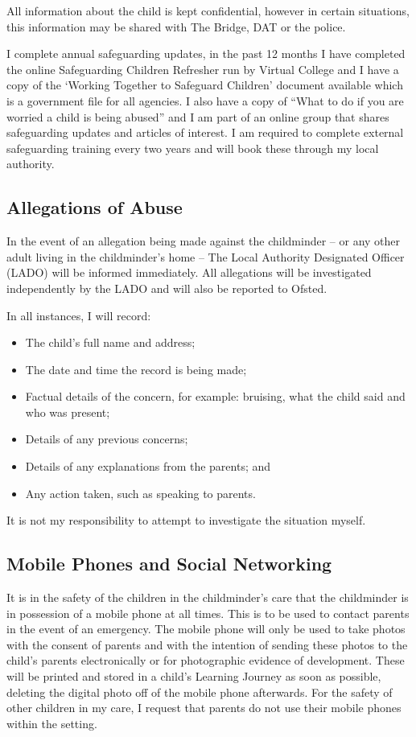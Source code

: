 All information about the child is kept confidential, however in certain
situations, this information may be shared with The Bridge, DAT or the
police.

I complete annual safeguarding updates, in the past 12 months I have completed the 
online Safeguarding Children Refresher run by Virtual College and I have a copy of 
the ‘Working Together to Safeguard Children’ document available which is 
a government file for all agencies. I also have a copy of “What to do if you are 
worried a child is being abused” and I am part of an online group that shares safeguarding 
updates and articles of interest. I am required to complete external safeguarding 
training every two years and will book these through my local authority.

\subsection{Allegations of Abuse}

In the event of an allegation being made against the childminder -- or
any other adult living in the childminder's home -- The Local Authority
Designated Officer (LADO) will be informed immediately. All allegations
will be investigated independently by the LADO and will also be reported
to Ofsted.

In all instances, I will record:
\begin{itemize}[topsep=0pt]
\item
  The child's full name and address;
\item
  The date and time the record is being made;
\item
  Factual details of the concern, for example: bruising, what the
  child said and who was present;
\item
  Details of any previous concerns;
\item
  Details of any explanations from the parents; and
\item
  Any action taken, such as speaking to parents.
\end{itemize}

It is not my responsibility to attempt to investigate the situation
myself.

\subsection{Mobile Phones and Social Networking}

It is in the safety of the children in the childminder's care that the
childminder is in possession of a mobile phone at all times. This is to
be used to contact parents in the event of an emergency. The mobile
phone will only be used to take photos with the consent of parents and 
with the intention of sending these photos to the child's parents electronically
or for photographic evidence of development. These will be printed and stored in 
a child's Learning Journey as soon as possible, deleting the digital photo off of 
the mobile phone afterwards. For the safety of other 
children in my care, I request that parents do not use their mobile
phones within the setting.

